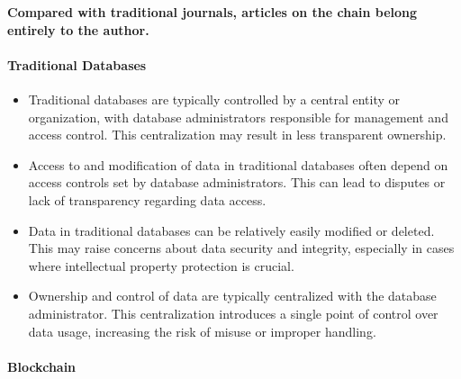 \documentclass[lettersize,journal]{IEEEtran}
\begin{document}
\textbf{Compared with traditional journals, articles on the chain belong entirely to the author.}


\paragraph{Traditional Databases}
\begin{itemize}
  \item Traditional databases are typically controlled by a central entity or organization, with database administrators responsible for management and access control. This centralization may result in less transparent ownership.

  \item Access to and modification of data in traditional databases often depend on access controls set by database administrators. This can lead to disputes or lack of transparency regarding data access.

  \item Data in traditional databases can be relatively easily modified or deleted. This may raise concerns about data security and integrity, especially in cases where intellectual property protection is crucial.

  \item Ownership and control of data are typically centralized with the database administrator. This centralization introduces a single point of control over data usage, increasing the risk of misuse or improper handling.
\end{itemize}

\paragraph{Blockchain}
\end{document}
